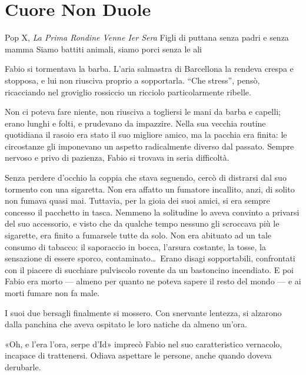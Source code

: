 \chapter{Cuore Non Duole}

\begin{chapquote}{Pop X, \textit{La Prima Rondine Venne Ier Sera}}
	Figli di puttana senza padri e senza mamma\newline
	Siamo battiti animali, siamo porci senza le ali
\end{chapquote}


Fabio si tormentava la barba. L'aria salmastra di Barcellona la rendeva crespa e stopposa, e lui non riusciva proprio a sopportarla. ``Che stress'', pensò, ricacciando nel groviglio rossiccio un ricciolo particolarmente ribelle.

Non ci poteva fare niente, non riusciva a togliersi le mani da barba e capelli; erano lunghi e folti, e prudevano da impazzire. Nella sua vecchia routine quotidiana il rasoio era stato il suo migliore amico, ma la pacchia era finita: le circostanze gli imponevano un aspetto radicalmente diverso dal passato. Sempre nervoso e privo di pazienza, Fabio si trovava in seria difficoltà.

Senza perdere d'occhio la coppia che stava seguendo, cercò di distrarsi dal suo tormento con una sigaretta. Non era affatto un fumatore incallito, anzi, di solito non fumava quasi mai. Tuttavia, per la gioia dei suoi amici, si era sempre concesso il pacchetto in tasca. Nemmeno la solitudine lo aveva convinto a privarsi del suo accessorio, e visto che da qualche tempo nessuno gli scroccava più le sigarette, era finito a fumarsele tutte da solo. Non era abituato ad un tale consumo di tabacco: il saporaccio in bocca, l'arsura costante, la tosse, la sensazione di essere sporco, contaminato\ldots\ Erano disagi sopportabili, confrontati con il piacere di succhiare pulviscolo rovente da un bastoncino incendiato. E poi Fabio era morto --- almeno per quanto ne poteva sapere il resto del mondo --- e ai morti fumare non fa male.

I suoi due bersagli finalmente si mossero. Con snervante lentezza, si alzarono dalla panchina che aveva ospitato le loro natiche da almeno un'ora.

«Oh, e l'era l'ora, serpe d'Id» imprecò Fabio nel suo caratteristico vernacolo, incapace di trattenersi. Odiava aspettare le persone, anche quando doveva derubarle. 

